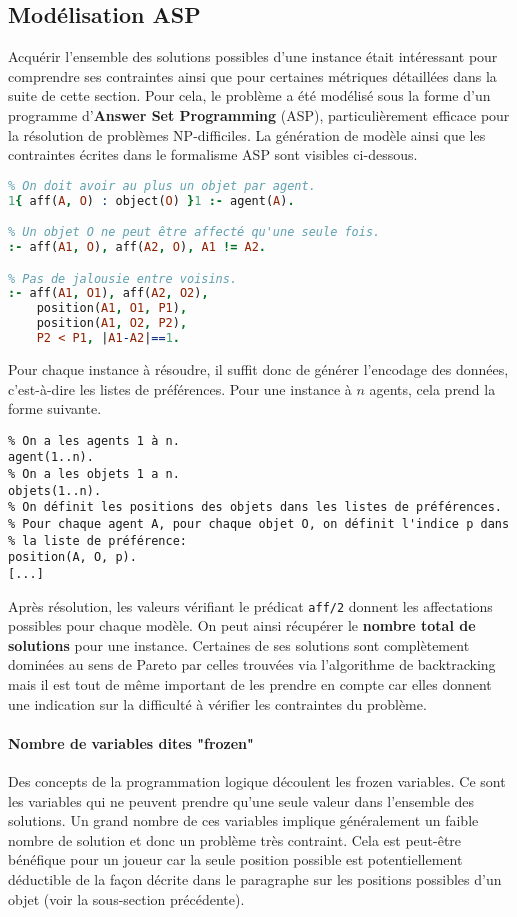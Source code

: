 \documentclass[../main.tex]{subfiles}
\begin{document}
	\subsection{Modélisation ASP}
	Acquérir l'ensemble des solutions possibles d'une instance était intéressant pour comprendre ses contraintes ainsi que pour certaines métriques détaillées dans la suite de cette section. Pour cela, le problème a été modélisé sous la forme d'un programme d'\textbf{Answer Set Programming} (ASP), particulièrement efficace pour la résolution de problèmes NP-difficiles. La génération de modèle ainsi que les contraintes écrites dans le formalisme ASP sont visibles ci-dessous.
\begin{lstlisting}[language=Prolog]
% Génération:
% On doit avoir au plus un objet par agent.
1{ aff(A, O) : object(O) }1 :- agent(A).

% Un objet O ne peut être affecté qu'une seule fois.
:- aff(A1, O), aff(A2, O), A1 != A2.

% Pas de jalousie entre voisins.
:- aff(A1, O1), aff(A2, O2), 
	position(A1, O1, P1), 
	position(A1, O2, P2), 
	P2 < P1, |A1-A2|==1.
\end{lstlisting}
Pour chaque instance à résoudre, il suffit donc de générer l'encodage des données, c'est-à-dire les listes de préférences. Pour une instance à $n$ agents, cela prend la forme suivante.
\begin{lstlisting}
% On a les agents 1 à n.
agent(1..n).
% On a les objets 1 a n.
objets(1..n).
% On définit les positions des objets dans les listes de préférences.
% Pour chaque agent A, pour chaque objet O, on définit l'indice p dans
% la liste de préférence:
position(A, O, p).
[...]
\end{lstlisting}
Après résolution, les valeurs vérifiant le prédicat \texttt{aff/2} donnent les affectations possibles pour chaque modèle. On peut ainsi récupérer le \textbf{nombre total de solutions} pour une instance. Certaines de ses solutions sont complètement dominées au sens de Pareto par celles trouvées via l'algorithme de backtracking mais il est tout de même important de les prendre en compte car elles donnent une indication sur la difficulté à vérifier les contraintes du problème.

	\paragraph{Nombre de variables dites "frozen"}{Des concepts de la programmation logique découlent les frozen variables. Ce sont les variables qui ne peuvent prendre qu'une seule valeur dans l'ensemble des solutions. Un grand nombre de ces variables implique généralement un faible nombre de solution et donc un problème très contraint. Cela est peut-être bénéfique pour un joueur car la seule position possible est potentiellement déductible de la façon décrite dans le paragraphe sur les positions possibles d'un objet (voir la sous-section précédente).}
	
\end{document}

